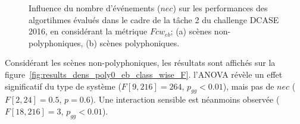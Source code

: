 \begin{figure}[t]
        \myfloatalign
        \par
        \par
       \caption[Influence du nombre d'événements ($nec$) sur les performances des algortihmes évalués dans le cadre de la tâche 2 du challenge DCASE 2016, en considérant la métrique $Fcw_{eb}$]{Influence du nombre d'événements ($nec$) sur les performances des algortihmes évalués dans le cadre de la tâche 2 du challenge DCASE 2016, en considérant la métrique $Fcw_{eb}$; (a) scènes non-polyphoniques, (b) scènes polyphoniques.}\label{fig:results_dens_eb_class_wise_F}
\end{figure}

Considérant les scènes non-polyphoniques, les résultats sont affichés sur la figure~\ref{fig:results_dens_poly0_eb_class_wise_F}. l'ANOVA révèle un effet significatif du type de système ($F[9,216]=264$, $p_{gg}<0.01$), mais pas de $nec$ ($F[2,24]=0.5$, $p=0.6$). Une interaction sensible est néanmoins observée ($F[18,216]=3$, $p_{gg}<0.01$).

